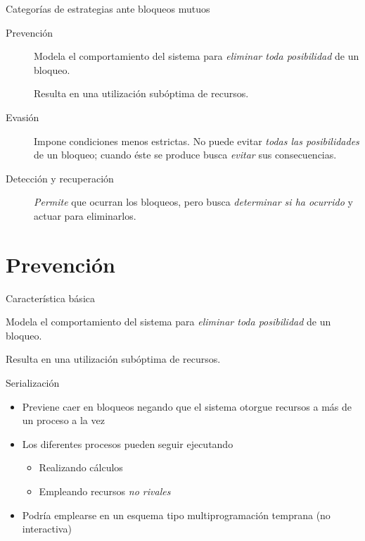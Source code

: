 \documentclass[presentation]{beamer}
\begin{document}
\begin{frame}[label={sec:org12a1083}]{Categorías de estrategias ante bloqueos mutuos}
\begin{description}
\item[{Prevención}] Modela el comportamiento del sistema para \emph{eliminar
toda posibilidad} de un bloqueo.

Resulta en una utilización subóptima de recursos.

\item[{Evasión}] Impone condiciones menos estrictas. No puede evitar
\emph{todas las posibilidades} de un bloqueo; cuando éste se
produce busca \emph{evitar} sus consecuencias.

\item[{Detección y recuperación}] \emph{Permite} que ocurran los bloqueos, pero
busca \emph{determinar si ha ocurrido} y actuar para eliminarlos.
\end{description}
\end{frame}

\section{Prevención}
\label{sec:orgcfd9c8a}

\begin{frame}[label={sec:org8d39e2e}]{Característica básica}
\begin{center}
Modela el comportamiento del sistema para \emph{eliminar toda posibilidad}
de un bloqueo.

Resulta en una utilización subóptima de recursos.
\end{center}
\end{frame}

\begin{frame}[label={sec:org0a78cf3}]{Serialización}
\begin{itemize}
\item Previene caer en bloqueos negando que el sistema otorgue recursos a
más de un proceso a la vez
\item Los diferentes procesos pueden seguir ejecutando
\begin{itemize}
\item Realizando cálculos
\item Empleando recursos \emph{no rivales}
\end{itemize}
\item Podría emplearse en un esquema tipo multiprogramación temprana (no
interactiva)
\end{itemize}
\end{frame}
\end{document}
